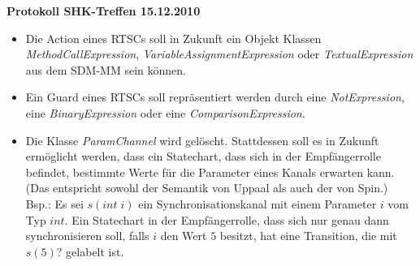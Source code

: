 \documentclass[11pt,a4paper]{article}
\begin{document}
\begin{center}

\textbf{\huge Protokoll SHK-Treffen 15.12.2010}\\[0.9cm]

\end{center}

\begin{itemize}
  \item Die Action eines RTSCs soll in Zukunft ein Objekt Klassen
  \emph{MethodCallExpression}, \emph{VariableAssignmentExpression} oder
  \emph{TextualExpression} aus dem SDM-MM sein können.
  \item Ein Guard eines RTSCs soll repräsentiert werden durch eine
  \emph{NotExpression}, eine \emph{BinaryExpression} oder eine
  \emph{ComparisonExpression}.
  \item Die Klasse \emph{ParamChannel} wird gelöscht. Stattdessen soll es in
  Zukunft ermöglicht werden, dass ein Statechart, dass sich in der
  Empfängerrolle befindet, bestimmte Werte für die Parameter eines Kanals
  erwarten kann. (Das entspricht sowohl der Semantik von Uppaal als auch der von
  Spin.) Bsp.: Es sei $s(int\;i)$ ein Synchronisationskanal mit einem Parameter
  $i$ vom Typ $int$. Ein Statechart in der Empfängerrolle, dass sich nur genau
  dann synchronisieren soll, falls $i$ den Wert $5$ besitzt, hat eine
  Transition, die mit $s(5)?$ gelabelt ist.
\end{itemize}
\end{document}
